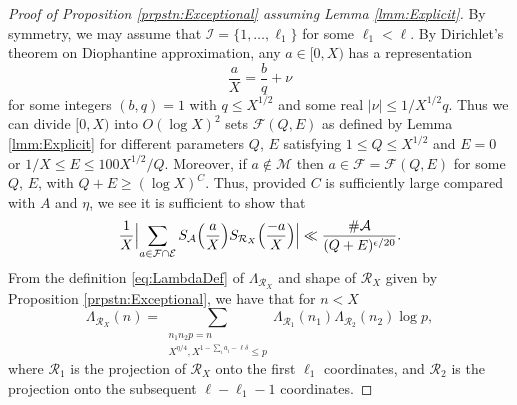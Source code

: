 \documentclass[10pt]{amsart}
\theoremstyle{plain}
\numberwithin{sblmm}{thrm}
\numberwithin{equation}{section}
\begin{document}
\begin{proof}[Proof of Proposition \ref{prpstn:Exceptional} assuming  Lemma \ref{lmm:Explicit}]
%
By symmetry, we may assume that $\mathcal{I}=\{1,\dots,\ell_1\}$ for some $\ell_1< \ell$. By Dirichlet's theorem on Diophantine approximation, any $a\in[0, X)$ has a representation
\[
\frac{a}{X}=\frac{b}{q}+\nu
\]
for some integers $(b,q)=1$ with $q\le X^{1/2}$ and some real $|\nu|\le 1/X^{1/2}q$. Thus we can divide $[0,X)$ into $O(\log{X})^2$ sets $\mathcal{F}(Q,E)$ as defined by Lemma \ref{lmm:Explicit} for different parameters $Q$, $E$ satisfying $1\le Q\le X^{1/2}$ and $E=0$ or $1/X\le E\le 100 X^{1/2}/Q$. Moreover, if $a\notin\mathcal{M}$ then $a\in\mathcal{F}=\mathcal{F}(Q,E)$ for some $Q$, $E$, with $Q+E\ge (\log{X})^C$. Thus, provided $C$ is sufficiently large compared with $A$ and $\eta$, we see it is sufficient to show that
\begin{equation}
\frac{1}{X}\Bigl|\sum_{a\in\mathcal{F}\cap\mathcal{E}}S_{\mathcal{A}}\Bigl(\frac{a}{X}\Bigr)S_{\mathcal{R}_X}\Bigl(\frac{-a}{X}\Bigr)\Bigr|\ll \frac{\#\mathcal{A}}{(Q+E)^{\epsilon/20}}.
\label{eq:ExcepBound1}
\end{equation}
From the definition \eqref{eq:LambdaDef} of $\Lambda_{\mathcal{R}_X}$ and shape of $\mathcal{R}_X$ given by Proposition \ref{prpstn:Exceptional}, we have that for $n<X$
\[
\Lambda_{\mathcal{R}_X}(n)=\sum_{\substack{n_1n_2p=n\\ X^{\eta/4},X^{1-\sum_ia_i-\ell\delta}\le p}}\Lambda_{\mathcal{R}_1}(n_1)\Lambda_{\mathcal{R}_2}(n_2)\log{p},
\]
where $\mathcal{R}_1$ is the projection of $\mathcal{R}_X$ onto the first $\ell_1$ coordinates, and $\mathcal{R}_2$ is the projection onto the subsequent $\ell-\ell_1-1$ coordinates.
%
%


\end{proof}
\end{document}
